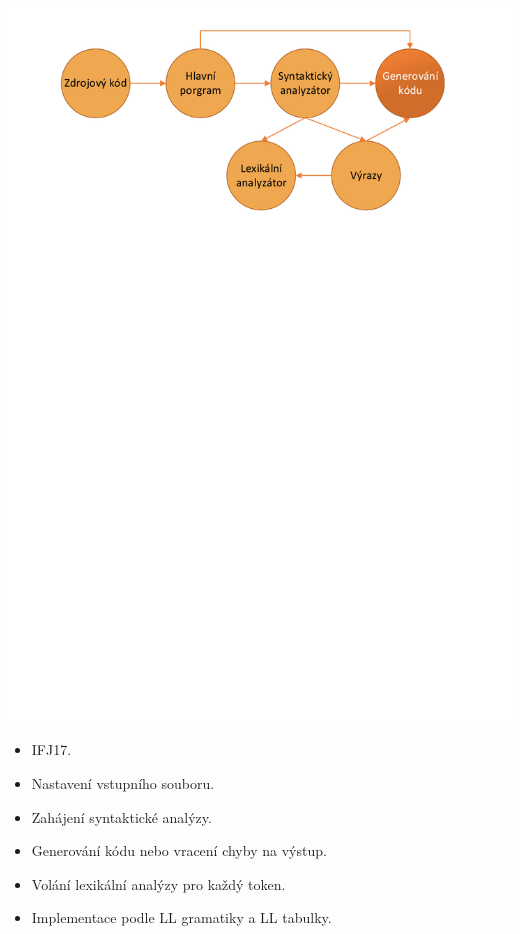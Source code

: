 \documentclass[11pt, hyperref={unicode}]{beamer}
\begin{document}
\begin{frame}
\begin{overprint}
 	\centerline{\includegraphics[width=0.95\linewidth]{img/generovani_kodu.pdf}}%
\end{overprint}
\vspace{-10cm}
\begin{overprint}
  	\begin{itemize}
		\item IFJ17.
	\end{itemize}
  	\begin{itemize}
		\item Nastavení vstupního souboru.
		\item Zahájení syntaktické analýzy.
		\item Generování kódu nebo vracení chyby na výstup.
	\end{itemize}
  	\begin{itemize}
		\item Volání lexikální analýzy pro každý token.
		\item Implementace podle LL gramatiky a LL tabulky.

\end{itemize}
\end{overprint}
\end{frame}
\end{document}
